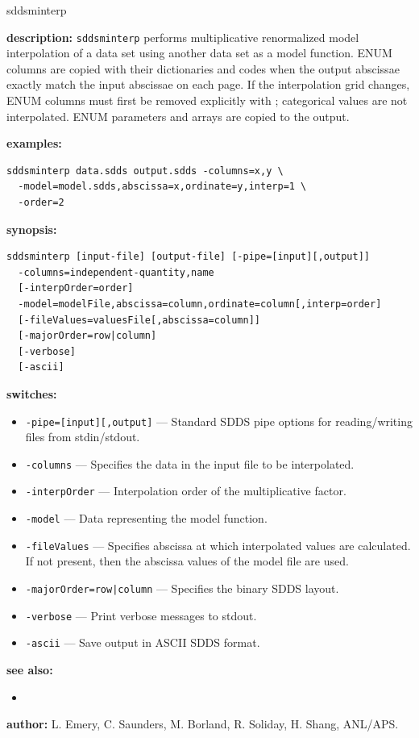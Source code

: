 \begin{sddsprog}{sddsminterp}
  \item \textbf{description:} \verb|sddsminterp| performs multiplicative renormalized model interpolation of a data set using another data set as a model function.
    ENUM columns are copied with their dictionaries and codes when the output abscissae exactly match the input abscissae on each page. If the interpolation grid changes, ENUM columns must first be removed explicitly with ; categorical values are not interpolated. ENUM parameters and arrays are copied to the output.
  \item \textbf{examples:}
    \begin{verbatim}
sddsminterp data.sdds output.sdds -columns=x,y \
  -model=model.sdds,abscissa=x,ordinate=y,interp=1 \
  -order=2
    \end{verbatim}
  \item \textbf{synopsis:}
    \begin{verbatim}
sddsminterp [input-file] [output-file] [-pipe=[input][,output]]
  -columns=independent-quantity,name
  [-interpOrder=order]
  -model=modelFile,abscissa=column,ordinate=column[,interp=order]
  [-fileValues=valuesFile[,abscissa=column]]
  [-majorOrder=row|column]
  [-verbose]
  [-ascii]
    \end{verbatim}
  \item \textbf{switches:}
    \begin{itemize}
    \item \verb|-pipe=[input][,output]| --- Standard SDDS pipe options for reading/writing files from stdin/stdout.
    \item \verb|-columns| --- Specifies the data in the input file to be interpolated.
    \item \verb|-interpOrder| --- Interpolation order of the multiplicative factor.
    \item \verb|-model| --- Data representing the model function.
    \item \verb|-fileValues| --- Specifies abscissa at which interpolated values are calculated. If not present, then the abscissa values of the model file are used.
    \item {\tt -majorOrder=row|column} --- Specifies the binary SDDS layout.
    \item \verb|-verbose| --- Print verbose messages to stdout.
    \item \verb|-ascii| --- Save output in ASCII SDDS format.
    \end{itemize}
  \item \textbf{see also:}
    \begin{itemize}
    \item {}
    \end{itemize}
  \item \textbf{author:} L. Emery, C. Saunders, M. Borland, R. Soliday, H. Shang, ANL/APS.
\end{sddsprog}
